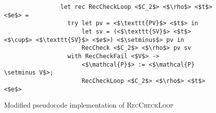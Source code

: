 \begin{figure}
\centering

\begin{verbatim}
                let rec RecCheckLoop <$C_2$> <$\rho$> <$t$> <$e$> =
                  try let pv = <$\texttt{PV}$> <$t$> in
                      let sv = (<$\texttt{SV}$> <$t$> <$\cup$> <$\texttt{SV}$> <$e$>) <$\setminus$> pv in
                      RecCheck <$C_2$> <$\rho$> pv sv
                  with RecCheckFail <$V$> ->
                      <$\mathcal{P}$> := <$\mathcal{P} \setminus V$>;
                      RecCheckLoop <$C_2$> <$\rho$> <$t$> <$e$>
\end{verbatim}

\caption{Modified pseudocode implementation of \textsc{RecCheckLoop}}
\label{fig:simpl-helpers}
\end{figure}